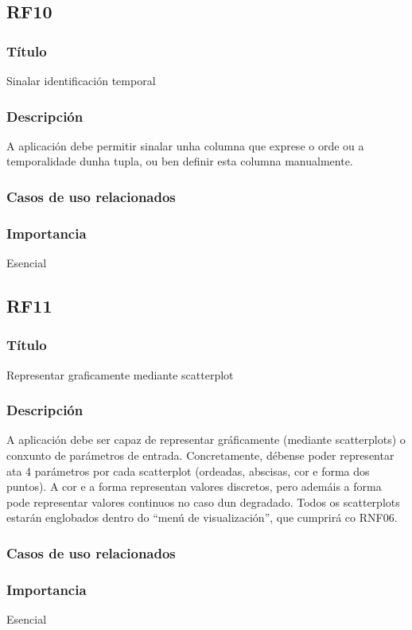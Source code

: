 \subsection{RF10}
\subsubsection{Título}
Sinalar identificación temporal
\subsubsection{Descripción}
A aplicación debe permitir sinalar unha columna que exprese o orde ou a temporalidade dunha tupla, ou ben definir esta columna manualmente.
\subsubsection{Casos de uso relacionados}
\subsubsection{Importancia}
Esencial

\subsection{RF11}
\subsubsection{Título}
Representar graficamente mediante scatterplot
\subsubsection{Descripción}
A aplicación debe ser capaz de representar gráficamente (mediante scatterplots) o conxunto de parámetros de entrada. Concretamente, débense poder representar ata 4 parámetros por cada scatterplot (ordeadas, abscisas, cor e forma dos puntos). A cor e a forma representan valores discretos, pero ademáis a forma pode representar valores continuos no caso dun degradado. Todos os scatterplots estarán englobados dentro do ``menú de visualización'', que cumprirá co RNF06.
\subsubsection{Casos de uso relacionados}
\subsubsection{Importancia}
Esencial

